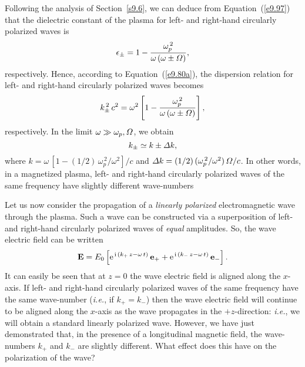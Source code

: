 Following the analysis of Section~\ref{s9.6}, we can deduce from Equation~(\ref{e9.97}) that the dielectric constant  of the plasma for left- and 
right-hand circularly
polarized waves is
\begin{equation}
\epsilon_{\pm} = 1 - \frac{\omega_p^{\,2}}{\omega\,(\omega\pm{\mit \Omega})},
\end{equation}
respectively.   Hence, according to Equation~(\ref{e9.80a}), the  dispersion relation
for left- and right-hand circularly polarized waves becomes
\begin{equation}
k_{\pm}^{\,2}\,c^2 = \omega^2\left[1- \frac{\omega_p^{\,2}}{\omega\,(\omega\pm{\mit \Omega})}\right],
\end{equation}
respectively.
In the limit $\omega \gg \omega_p, {\mit \Omega}$, we obtain
\begin{equation}\label{e9.104}
k_{\pm}\simeq k\pm {\mit\Delta} k,
\end{equation}
where $k= \omega\,[1-(1/2)\,\omega_p^{\,2}/\omega^2]/c$ and
${\mit\Delta} k = (1/2)\,(\omega_p^{\,2}/\omega^2)\,{\mit \Omega}/c$. In other words, in a magnetized plasma,
left- and right-hand circularly polarized waves of the same frequency have
slightly different wave-numbers

Let us now consider the propagation of a {\em linearly polarized}\/ electromagnetic
wave through the plasma. Such a wave can be constructed via a superposition
of left- and  right-hand circularly polarized waves of {\em equal}\/
amplitudes. So, the wave electric field can be written
\begin{equation}\label{e9.105}
{\bf E} = E_0 \left[{\rm e}^{\,{\rm i}\,(k_+\,z-\omega\,t)}\,{\bf e}_+
+ {\rm e}^{\,{\rm i}\,(k_-\,z-\omega\,t)}\,{\bf e}_- \right].
\end{equation}
It can easily be seen that at $z=0$ the wave electric field is aligned
along the $x$-axis. If left- and right-hand circularly polarized waves
of the same frequency have the same wave-number ({\em i.e.}, if
$k_+=k_-$) then the wave electric field will continue to be aligned
along the $x$-axis as the wave propagates  in the $+z$-direction:
{\em i.e.}, we will obtain a standard linearly polarized wave. However, we have just
demonstrated
that, in the presence of a longitudinal magnetic field, the wave-numbers $k_+$ and $k_-$
are slightly different. What effect does this have on the polarization of the
wave?

